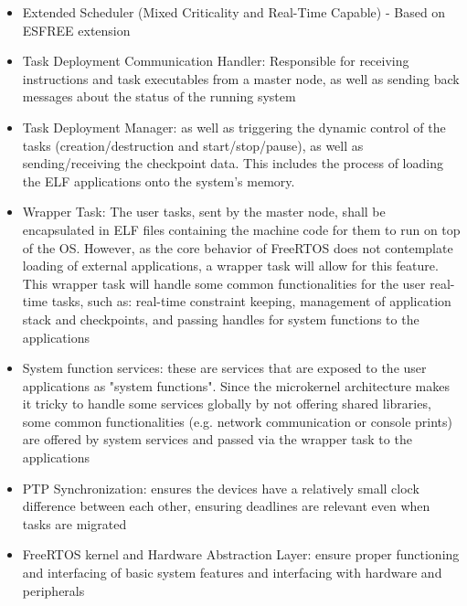 \begin{itemize}
	\item Extended Scheduler (Mixed Criticality and Real-Time Capable) - Based on ESFREE extension
	\item Task Deployment Communication Handler: Responsible for receiving instructions and task executables from a master node, as well as sending back messages about the status of the running system	
	\item Task Deployment Manager:  as well as triggering the dynamic control of the tasks (creation/destruction and start/stop/pause), as well as sending/receiving the checkpoint data. This includes the process of loading the ELF applications onto the system's memory.
	\item Wrapper Task: The user tasks, sent by the master node, shall be encapsulated in ELF files containing the machine code for them to run on top of the OS. However, as the core behavior of FreeRTOS does not contemplate loading of external applications, a wrapper task will allow for this feature. This wrapper task will handle some common functionalities for the user real-time tasks, such as: real-time constraint keeping, management of application stack and checkpoints, and passing handles for system functions to the applications
	\item System function services: these are services that are exposed to the user applications as "system functions". Since the microkernel architecture makes it tricky to handle some services globally by not offering shared libraries, some common functionalities (e.g. network communication or console prints) are offered by system services and passed via the wrapper task to the applications 
	\item PTP Synchronization: ensures the devices have a relatively small clock difference between each other, ensuring deadlines are relevant even when tasks are migrated
	\item FreeRTOS kernel and Hardware Abstraction Layer: ensure proper functioning and interfacing of basic system features and interfacing with hardware and peripherals
\end{itemize}


